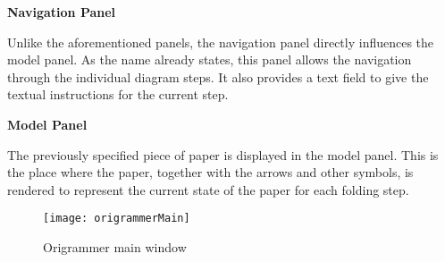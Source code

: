 \textbf{Navigation Panel}

Unlike the aforementioned panels, the navigation panel directly influences the model panel. As the name already states, this panel allows the navigation through the individual diagram steps. It also provides a text field to give the textual instructions for the current step.

\textbf{Model Panel}

The previously specified piece of paper is displayed in the model panel. This is the place where the paper, together with the arrows and other symbols, is rendered to represent the current state of the paper for each folding step.

\begin{figure}[h]
	\centering
	\texttt{[image: origrammerMain]}
	\caption{Origrammer main window}
	\label{fig:origrammerMain}
\end{figure}
